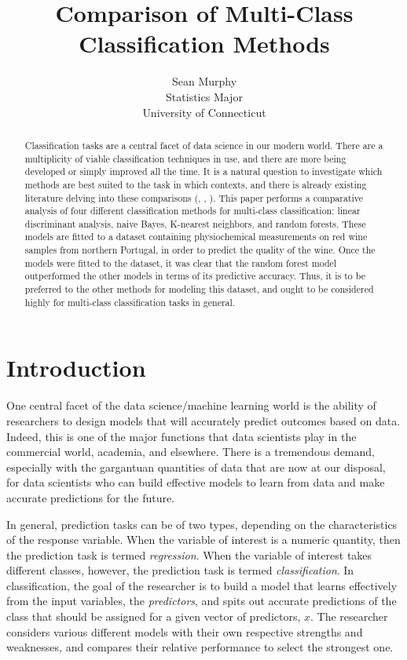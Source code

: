 \documentclass[12pt]{article}
\title{Comparison of Multi-Class Classification Methods}
\author{Sean Murphy\\
  Statistics Major\\
  University of Connecticut
}
\begin{document}
\maketitle

\begin{abstract}

Classification tasks are a central facet of data science in our modern world.  
There are a multiplicity of viable classification techniques in use, and there 
are more being developed or simply improved all the time.  It is a natural 
question to investigate which methods are best suited to the task in which 
contexts, and there is already existing literature delving into these 
comparisons (\citet{alsafy2014multiclass}, \citet{khan2023comparison}, 
\citet{szollHosi2012comparison}).  This paper performs a comparative analysis 
of four different classification methods for multi-class classification: 
linear discriminant analysis, naive Bayes, K-nearest neighbors, and random 
forests. These models are fitted to a dataset containing physiochemical 
measurements on red wine samples from northern Portugal, in order to predict 
the quality of the wine.  Once the models were fitted to the dataset, it was 
clear that the random forest model outperformed the other models in terms of 
its predictive accuracy.  Thus, it is to be preferred to the other methods for 
modeling this dataset, and ought to be considered highly for multi-class 
classification tasks in general.  

\end{abstract}

\section{Introduction}
\label{sec:intro}

One central facet of the data science/machine learning world is the ability 
of researchers to design models that will accurately predict outcomes based 
on data.  Indeed, this is one of the major functions that data scientists 
play in the commercial world, academia, and elsewhere.  There is a tremendous 
demand, especially with the gargantuan quantities of data that are now at our 
disposal, for data scientists who can build effective models to learn from 
data and make accurate predictions for the future.

In general, prediction tasks can be of two types, depending on the characteristics 
of the response variable.  When the variable of interest is a numeric quantity, 
then the prediction task is termed \textit{regression}.  When the variable of 
interest takes different classes, however, the prediction task is termed 
\textit{classification}.  In classification, the goal of the researcher is to build 
a model that learns effectively from the input variables, the \textit{predictors}, 
and spits out accurate predictions of the class that should be assigned for a given 
vector of predictors, $x$.  The researcher considers various different models with 
their own respective strengths and weaknesses, and compares their relative 
performance to select the strongest one. 
\end{document}
